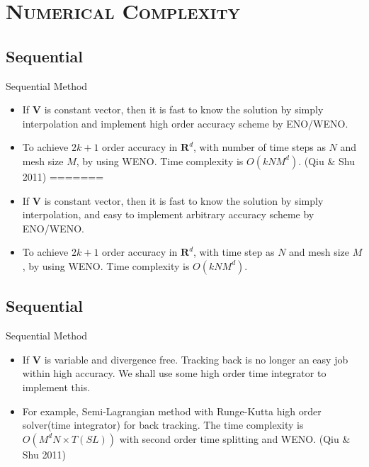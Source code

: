 \documentclass[xcolor=x11names,compress]{beamer}
\renewcommand{\(}{\begin{columns}}
\renewcommand{\)}{\end{columns}}
\newcommand{\<}[1]{\begin{column}{#1}}
\renewcommand{\>}{\end{column}}
\begin{document}
\section{\scshape Numerical Complexity}
\subsection{Sequential}


\begin{frame}{Sequential Method}
\begin{itemize}
\item If $\mathbf{V}$ is constant vector, then it is fast to know the solution by simply interpolation and implement high order accuracy scheme by ENO/WENO.
\item To achieve $2k+1$ order accuracy in $\mathbf{R}^d$, with number of time steps as $N$ and mesh size $M$, by using WENO. Time complexity is $O(kNM^d)$. (Qiu \& Shu 2011)
=======
\item If $\mathbf{V}$ is constant vector, then it is fast to know the solution by simply interpolation, and easy to implement arbitrary accuracy scheme by ENO/WENO.
\item To achieve $2k+1$ order accuracy in $\mathbf{R}^d$, with time step as $N$ and mesh size $M$, by using WENO. Time complexity is $O(kNM^d)$.
\end{itemize}
\end{frame}


\subsection{Sequential}
\begin{frame}{Sequential Method}
\begin{itemize}
\item If $\mathbf{V}$ is variable and divergence free. Tracking back is no longer an easy job within high accuracy. We shall use some high order time integrator to implement this. 
\item For example, Semi-Lagrangian method with Runge-Kutta high order solver(time integrator) for back tracking. The time complexity is $O(M^d N\times T(SL))$ 
with second order time splitting and WENO. (Qiu \& Shu 2011)
\end{itemize}
\end{frame}

\end{document}
